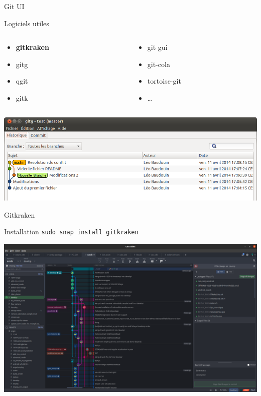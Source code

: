 \documentclass{beamer}
\begin{document}
\begin{frame}{Git UI}

  \begin{block}{Logiciels utiles}
  \begin{columns}
    \begin{column}{0.48\textwidth}
    \begin{itemize}
    \item \textbf{gitkraken}
    \item gitg
    \item qgit
    \item gitk
    \end{itemize}
    \end{column}
    \begin{column}{0.48\textwidth}
    \begin{itemize}
    \item git gui
    \item git-cola
    \item tortoise-git
    \item \dots
    \end{itemize}
    \end{column}
  \end{columns}
  
    
  \end{block}
  \includegraphics[width=1\linewidth]{images/gitg}  

\end{frame}

\begin{frame}[fragile]{Gitkraken}

  \begin{block}{Installation}
 \textcolor{commandcolor}{\verb?sudo snap install gitkraken?}
  \end{block}
  \includegraphics[width=1\linewidth]{images/gitkraken}  

\end{frame}
\end{document}
